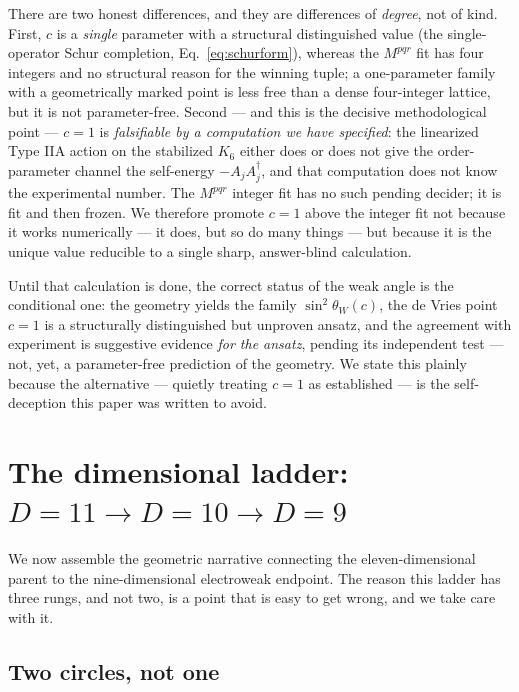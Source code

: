 \documentclass[11pt]{article}
\theoremstyle{plain}
\theoremstyle{definition}
\begin{document}
There are two honest differences, and they are differences of \emph{degree},
not of kind. First, $c$ is a \emph{single} parameter with a structural
distinguished value (the single-operator Schur completion,
Eq.~\eqref{eq:schurform}), whereas the $M^{pqr}$ fit has four integers and
no structural reason for the winning tuple; a one-parameter family with a
geometrically marked point is less free than a dense four-integer lattice, but
it is not parameter-free. Second --- and this is the decisive methodological
point --- $c=1$ is \emph{falsifiable by a computation we have specified}: the
linearized Type IIA action on the stabilized $K_6$ either does or does not
give the order-parameter channel the self-energy $-A_jA_j^\dagger$, and that
computation does not know the experimental number. The $M^{pqr}$ integer fit
has no such pending decider; it is fit and then frozen. We therefore promote
$c=1$ above the integer fit not because it works numerically --- it does, but
so do many things --- but because it is the unique value reducible to a
single sharp, answer-blind calculation.

Until that calculation is done, the correct status of the weak angle is the
conditional one: the geometry yields the family $\sin^2\theta_W(c)$, the de
Vries point $c=1$ is a structurally distinguished but unproven ansatz, and the
agreement with experiment is suggestive evidence \emph{for the ansatz},
pending its independent test --- not, yet, a parameter-free prediction of the
geometry. We state this plainly because the alternative --- quietly treating
$c=1$ as established --- is the self-deception this paper was written
to avoid.

\section{The dimensional ladder: $D=11\to D=10\to D=9$}
\label{sec:ladder}

We now assemble the geometric narrative connecting the eleven-dimensional
parent to the nine-dimensional electroweak endpoint. The reason this ladder
has three rungs, and not two, is a point that is easy to get wrong, and we
take care with it.

\subsection{Two circles, not one}
\end{document}
